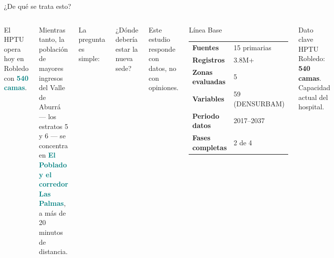 \documentclass[aspectratio=169, 11pt]{beamer}
\newcommand{\highlight}[1]{\textcolor{teal}{\textbf{#1}}}
\begin{document}
\begin{frame}{¿De qué se trata esto?}

\begin{columns}[T]
El HPTU opera hoy en Robledo con \highlight{540 camas}.

\vspace{8pt}
Mientras tanto, la población de mayores ingresos del Valle de Aburrá --- los estratos 5 y 6 --- se concentra en \highlight{El Poblado y el corredor Las Palmas}, a más de 20 minutos de distancia.

\vspace{8pt}
La pregunta es simple:

\vspace{4pt}
\begin{exampleblock}{}
\centering\large
¿Dónde debería estar la nueva sede?
\end{exampleblock}

\vspace{8pt}
Este estudio responde con datos, no con opiniones.

\begin{block}{Línea Base}
\small
\begin{tabular}{@{}ll@{}}
\toprule
\textbf{Fuentes} & 15 primarias \\
\textbf{Registros} & 3.8M+ \\
\textbf{Zonas evaluadas} & 5 \\
\textbf{Variables} & 59 (DENSURBAM) \\
\textbf{Periodo datos} & 2017--2037 \\
\textbf{Fases completas} & 2 de 4 \\
\bottomrule
\end{tabular}
\end{block}

\vspace{6pt}
\begin{alertblock}{\small Dato clave}
\small HPTU Robledo: \textbf{540 camas}.\\
Capacidad actual del hospital.
\end{alertblock}
\end{columns}
\end{frame}
\end{document}
